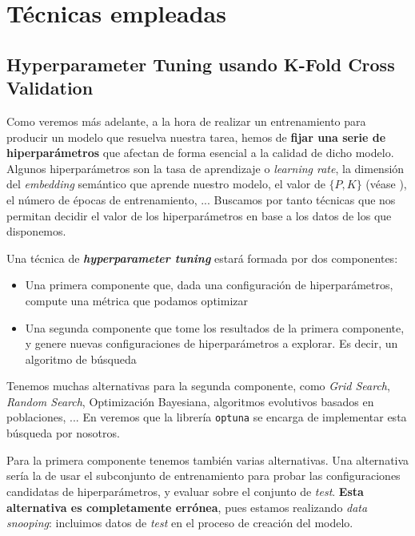 \section{Técnicas empleadas}

\subsection{Hyperparameter Tuning usando K-Fold Cross Validation} \label{isec:hptuning_kfold_cross_validation}

Como veremos más adelante, a la hora de realizar un entrenamiento para producir un modelo que resuelva nuestra tarea, hemos de \textbf{fijar una serie de hiperparámetros} que afectan de forma esencial a la calidad de dicho modelo. Algunos hiperparámetros son la tasa de aprendizaje o \textit{learning rate}, la dimensión del \textit{embedding} semántico que aprende nuestro modelo, el valor de $\{P, K\}$ (véase ), el número de épocas de entrenamiento, ... Buscamos por tanto técnicas que nos permitan decidir el valor de los hiperparámetros en base a los datos de los que disponemos.

Una técnica de \textbf{\textit{hyperparameter tuning}} estará formada por dos componentes:

\begin{itemize}
    \item Una primera componente que, dada una configuración de hiperparámetros, compute una métrica que podamos optimizar
    \item Una segunda componente que tome los resultados de la primera componente, y genere nuevas configuraciones de hiperparámetros a explorar. Es decir, un algoritmo de búsqueda
\end{itemize}

Tenemos muchas alternativas para la segunda componente, como \textit{Grid Search}, \textit{Random Search}, Optimización Bayesiana, algoritmos evolutivos basados en poblaciones, ... \cite{informatica:review_algoritmos_hp} En  veremos que la librería \lstinline{optuna} se encarga de implementar esta búsqueda por nosotros.

Para la primera componente tenemos también varias alternativas. Una alternativa sería la de usar el subconjunto de entrenamiento para probar las configuraciones candidatas de hiperparámetros, y evaluar sobre el conjunto de \textit{test}. \textbf{Esta alternativa es completamente errónea}, pues estamos realizando \textit{data snooping}: incluimos datos de \textit{test} en el proceso de creación del modelo.

